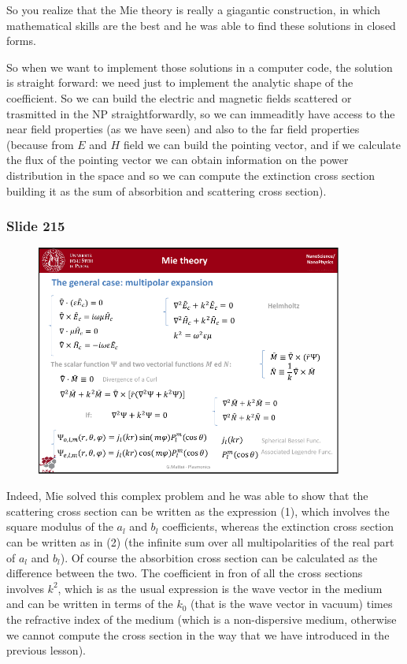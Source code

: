 \documentclass[../main/main.tex]{subfiles}
\begin{document}
So you realize that the Mie theory is really a giagantic construction, in which mathematical skills are the best and he was able to find these solutions in closed forms.

So when we want to implement those solutions in a computer code, the solution is straight forward: we need just to implement the analytic shape of the coefficient. So we can build the electric and magnetic fields scattered or trasmitted in the NP straightforwardly, so we can immeaditly have access to the near field properties (as we have seen) and also to the far field properties (because from \( E \) and \( H \) field we can build the pointing vector, and if we calculate the flux of the pointing vector we can obtain information on the power distribution in the space and so we can compute the extinction cross section building it as the sum of absorbition and scattering cross section).

\newpage

\subsubsection{Slide 215}

\begin{figure}[h!]
\centering
\includegraphics[page=8,width=0.9\textwidth]{../lessons/pdf_file/13_lesson.pdf}
\end{figure}

Indeed, Mie solved this complex problem and he was able to show that the scattering cross section can be written as the expression (1), which involves the square modulus of the \( a_l \) and \( b_l \) coefficients, whereas the extinction cross section can be written as in (2) (the infinite sum over all multipolarities of the real part of \( a_l  \) and \( b_l \)). Of course the absorbition cross section can be calculated as the difference between the two.
The coefficient in fron of all the cross sections involves \( k^2 \), which is as the usual expression is the wave vector in the medium and can be written in terms of the \( k_0 \) (that is the wave vector in vacuum) times the refractive index of the medium (which is a non-dispersive medium, otherwise we cannot compute the cross section in the way that we have introduced in the previous lesson).
\end{document}
